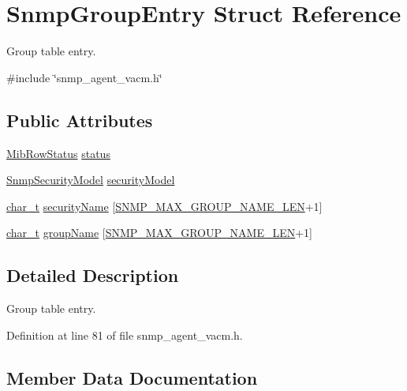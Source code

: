 \hypertarget{structSnmpGroupEntry}{}\section{Snmp\+Group\+Entry Struct Reference}
\label{structSnmpGroupEntry}


Group table entry.  




{\ttfamily \#include \char`\"{}snmp\+\_\+agent\+\_\+vacm.\+h\char`\"{}}

\subsection*{Public Attributes}
\begin{DoxyCompactItemize}
\item 
\hyperlink{mib__common_8h_a40ce1ea958f5c3b04f841d76f5557097}{Mib\+Row\+Status} \hyperlink{structSnmpGroupEntry_a4ef2232ee93ed76fc09656ca669db373}{status}
\item 
\hyperlink{snmp__agent__usm_8h_a59354ab45890b9da1b27d44f88193695}{Snmp\+Security\+Model} \hyperlink{structSnmpGroupEntry_a49d7c30c44a6ee54b7febef1e0fe2e2f}{security\+Model}
\item 
\hyperlink{compiler__port_8h_a40bb5262bf908c328fbcfbe5d29d0201}{char\+\_\+t} \hyperlink{structSnmpGroupEntry_a5e747f5e2226fd1e218689b5bac75344}{security\+Name} \mbox{[}\hyperlink{snmp__common_8h_a0810d82091ca56abdd23f86a04944c32}{S\+N\+M\+P\+\_\+\+M\+A\+X\+\_\+\+G\+R\+O\+U\+P\+\_\+\+N\+A\+M\+E\+\_\+\+L\+EN}+1\mbox{]}
\item 
\hyperlink{compiler__port_8h_a40bb5262bf908c328fbcfbe5d29d0201}{char\+\_\+t} \hyperlink{structSnmpGroupEntry_af3ec2a0fe036650f877493147eed85b6}{group\+Name} \mbox{[}\hyperlink{snmp__common_8h_a0810d82091ca56abdd23f86a04944c32}{S\+N\+M\+P\+\_\+\+M\+A\+X\+\_\+\+G\+R\+O\+U\+P\+\_\+\+N\+A\+M\+E\+\_\+\+L\+EN}+1\mbox{]}
\end{DoxyCompactItemize}


\subsection{Detailed Description}
Group table entry. 

Definition at line 81 of file snmp\+\_\+agent\+\_\+vacm.\+h.



\subsection{Member Data Documentation}
\mbox{\label{structSnmpGroupEntry_af3ec2a0fe036650f877493147eed85b6}} 
